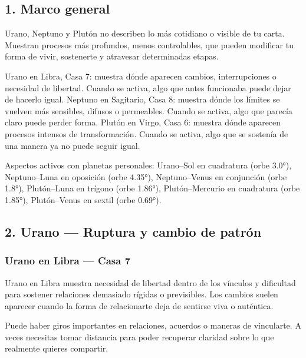 \documentclass[11pt,a4paper]{article}
\begin{document}
\subsection{1. Marco general}

Urano, Neptuno y Plutón no describen lo más cotidiano o visible de tu carta. Muestran procesos más profundos, menos controlables, que pueden modificar tu forma de vivir, sostenerte y atravesar determinadas etapas.

Urano en Libra, Casa 7: muestra dónde aparecen cambios, interrupciones o necesidad de libertad. Cuando se activa, algo que antes funcionaba puede dejar de hacerlo igual.
Neptuno en Sagitario, Casa 8: muestra dónde los límites se vuelven más sensibles, difusos o permeables. Cuando se activa, algo que parecía claro puede perder forma.
Plutón en Virgo, Casa 6: muestra dónde aparecen procesos intensos de transformación. Cuando se activa, algo que se sostenía de una manera ya no puede seguir igual.

Aspectos activos con planetas personales: Urano–Sol en cuadratura (orbe 3.0°), Neptuno–Luna en oposición (orbe 4.35°), Neptuno–Venus en conjunción (orbe 1.8°), Plutón–Luna en trígono (orbe 1.86°), Plutón–Mercurio en cuadratura (orbe 1.85°), Plutón–Venus en sextil (orbe 0.69°).

\vspace{0.8cm}


\subsection{2. Urano — Ruptura y cambio de patrón}

\subsubsection*{Urano en Libra — Casa 7}

Urano en Libra muestra necesidad de libertad dentro de los vínculos y dificultad para sostener relaciones demasiado rígidas o previsibles. Los cambios suelen aparecer cuando la forma de relacionarte deja de sentirse viva o auténtica.

Puede haber giros importantes en relaciones, acuerdos o maneras de vincularte. A veces necesitas tomar distancia para poder recuperar claridad sobre lo que realmente quieres compartir.
\end{document}
